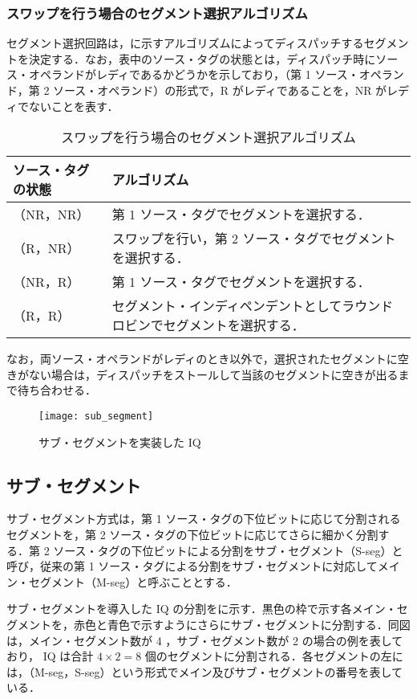 \subsubsection{スワップを行う場合のセグメント選択アルゴリズム}
セグメント選択回路は，に示すアルゴリズムによってディスパッチするセグメントを決定する．なお，表中のソース・タグの状態とは，ディスパッチ時にソース・オペランドがレディであるかどうかを示しており，（第 1 ソース・オペランド，第 2 ソース・オペランド）の形式で，R がレディであることを，NR がレディでないことを表す．

\begin{table}[htb]
  \caption{スワップを行う場合のセグメント選択アルゴリズム}
  \footnotesize
  \center
   \begin{tabular}{|l|l|} \hline \hline
    ソース・タグの状態 & アルゴリズム \\ \hline
    （NR，NR） & 第 1 ソース・タグでセグメントを選択する． \\ \hline
    （R，NR） & スワップを行い，第 2 ソース・タグでセグメントを選択する．\\ \hline
    （NR，R） & 第 1 ソース・タグでセグメントを選択する．\\ \hline
    （R，R） & セグメント・インディペンデントとしてラウンドロビンでセグメントを選択する． \\ \hline
  \end{tabular}
  \label{tab:agg_algorithm}
\end{table}
なお，両ソース・オペランドがレディのとき以外で，選択されたセグメントに空きがない場合は，ディスパッチをストールして当該のセグメントに空きが出るまで待ち合わせる．

\begin{figure}[htb]
  \centering
  \texttt{[image: sub\_segment]}
  \caption{サブ・セグメントを実装した IQ}
  \label{fig:sub_segment}
\end{figure}

\subsection{サブ・セグメント}
\label{sec:sub_segment}
サブ・セグメント方式は，第 1 ソース・タグの下位ビットに応じて分割されるセグメントを，第 2 ソース・タグの下位ビットに応じてさらに細かく分割する．第 2 ソース・タグの下位ビットによる分割をサブ・セグメント（S-seg）と呼び，従来の第 1 ソース・タグによる分割をサブ・セグメントに対応してメイン・セグメント（M-seg）と呼ぶこととする．

サブ・セグメントを導入した IQ の分割をに示す．黒色の枠で示す各メイン・セグメントを，赤色と青色で示すようにさらにサブ・セグメントに分割する．同図は，メイン・セグメント数が 4 ，サブ・セグメント数が 2 の場合の例を表しており， IQ は合計 $4 \times 2 = 8$ 個のセグメントに分割される．各セグメントの左には，（M-seg，S-seg）という形式でメイン及びサブ・セグメントの番号を表している．

